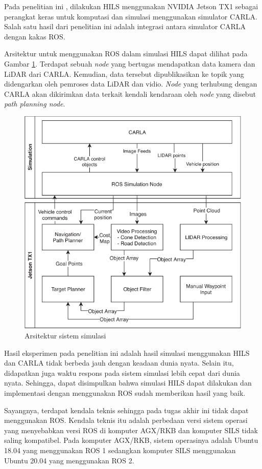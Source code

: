 Pada penelitian ini \parencite{brogle_CarlaHILS}, dilakukan HILS menggunakan
NVIDIA Jetson TX1 sebagai perangkat keras untuk komputasi dan simulasi
menggunakan simulator CARLA. Salah satu hasil dari penelitian ini adalah
integrasi antara simulator CARLA dengan kakas ROS.

Arsitektur untuk menggunakan ROS dalam simulasi HILS dapat dilihat pada Gambar
\ref{chapter-2-carla-jetson-arch}. Terdapat sebuah \textit{node}  yang
bertugas mendapatkan data kamera dan LiDAR dari CARLA. Kemudian, data tersebut
dipublikasikan ke topik yang didengarkan oleh pemroses data LiDAR dan vidio.
\textit{Node} yang terhubung dengan CARLA akan dikirimkan data terkait kendali
kendaraan oleh \textit{node} yang disebut \textit{path planning node}.

\begin{figure}[h!]
    \centering
    \includegraphics[width=1.0\textwidth]{resources/chapter-2/carla-jetson-arch.png}
    \caption{Arsitektur sistem simulasi \parencite{brogle_CarlaHILS}}
    \label{chapter-2-carla-jetson-arch}
\end{figure}

Hasil eksperimen pada penelitian ini adalah hasil simulasi menggunakan HILS dan
CARLA tidak berbeda jauh dengan keadaan dunia nyata. Selain itu, didapatkan juga
waktu respons pada sistem simulasi lebih cepat dari dunia nyata. Sehingga, dapat
disimpulkan bahwa simulasi HILS dapat dilakukan dan implementasi dengan
menggunakan ROS sudah memberikan hasil yang baik.

Sayangnya, terdapat kendala teknis sehingga pada tugas akhir ini tidak dapat
menggunakan ROS. Kendala teknis itu adalah perbedaan versi sistem operasi yang
menyebabkan versi ROS di komputer AGX/RKB dan komputer SILS tidak saling
kompatibel. Pada komputer AGX/RKB, sistem operasinya adalah Ubuntu 18.04 yang
menggunakan ROS 1 sedangkan komputer SILS menggunakan Ubuntu 20.04 yang
menggunakan ROS 2.

